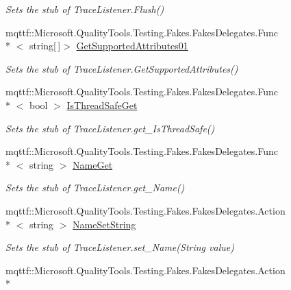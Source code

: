 \begin{DoxyCompactItemize}
\begin{DoxyCompactList}\small\item\em Sets the stub of Trace\-Listener.\-Flush()\end{DoxyCompactList}\item 
mqttf\-::\-Microsoft.\-Quality\-Tools.\-Testing.\-Fakes.\-Fakes\-Delegates.\-Func\\*
$<$ string\mbox{[}$\,$\mbox{]}$>$ \hyperlink{class_system_1_1_diagnostics_1_1_fakes_1_1_stub_trace_listener_ab2d5317190a9255913b8c5947ff6c2ce}{Get\-Supported\-Attributes01}
\begin{DoxyCompactList}\small\item\em Sets the stub of Trace\-Listener.\-Get\-Supported\-Attributes()\end{DoxyCompactList}\item 
mqttf\-::\-Microsoft.\-Quality\-Tools.\-Testing.\-Fakes.\-Fakes\-Delegates.\-Func\\*
$<$ bool $>$ \hyperlink{class_system_1_1_diagnostics_1_1_fakes_1_1_stub_trace_listener_ac83c69204f8d645cef263b301d472b64}{Is\-Thread\-Safe\-Get}
\begin{DoxyCompactList}\small\item\em Sets the stub of Trace\-Listener.\-get\-\_\-\-Is\-Thread\-Safe()\end{DoxyCompactList}\item 
mqttf\-::\-Microsoft.\-Quality\-Tools.\-Testing.\-Fakes.\-Fakes\-Delegates.\-Func\\*
$<$ string $>$ \hyperlink{class_system_1_1_diagnostics_1_1_fakes_1_1_stub_trace_listener_ac09c6738f8d307db72f87fe414e46c5a}{Name\-Get}
\begin{DoxyCompactList}\small\item\em Sets the stub of Trace\-Listener.\-get\-\_\-\-Name()\end{DoxyCompactList}\item 
mqttf\-::\-Microsoft.\-Quality\-Tools.\-Testing.\-Fakes.\-Fakes\-Delegates.\-Action\\*
$<$ string $>$ \hyperlink{class_system_1_1_diagnostics_1_1_fakes_1_1_stub_trace_listener_a3840bfd0718d68b475e4934749141b93}{Name\-Set\-String}
\begin{DoxyCompactList}\small\item\em Sets the stub of Trace\-Listener.\-set\-\_\-\-Name(\-String value)\end{DoxyCompactList}\item 
mqttf\-::\-Microsoft.\-Quality\-Tools.\-Testing.\-Fakes.\-Fakes\-Delegates.\-Action\\*

\end{DoxyCompactItemize}
